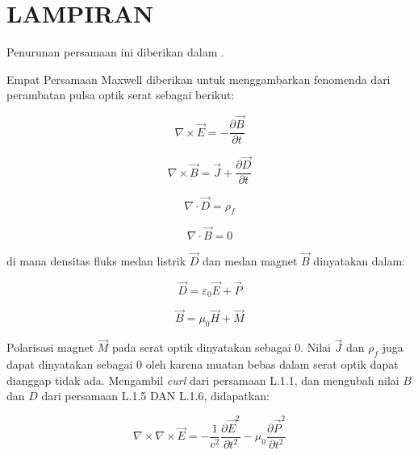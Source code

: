 \chapter*{LAMPIRAN}
\renewcommand{\thetable}{L\theappendix\arabic{table}}
\renewcommand{\thefigure}{L\theappendix\arabic{figure}}
\renewcommand{\theequation}{L\theappendix\arabic{equation}}

Penurunan persamaan ini diberikan dalam .

Empat Persamaan Maxwell diberikan untuk menggambarkan fenomenda dari perambatan pulsa optik serat sebagai berikut: 

\begin{equation}
    \nabla \times \vec{E} = - \frac{\partial \vec{B}}{\partial t}
\end{equation}

\begin{equation}
    \nabla \times \vec{B} = \vec{J}+\frac{\partial \vec{D}}{\partial t}
\end{equation}

\begin{equation}
    \nabla \cdot \vec{D} = \rho_f
\end{equation}

\begin{equation}
    \nabla \cdot \vec{B} = 0
\end{equation}

di mana densitas fluks medan listrik \(\vec{D}\) dan medan magnet \(\vec{B}\) dinyatakan dalam: 

\begin{equation}
    \vec{D} = \varepsilon_0\vec{E} + \vec{P}
\end{equation}

\begin{equation}
    \vec{B} = \mu_0 \vec{H} + \vec{M}
\end{equation}

Polarisasi magnet \(\vec{M}\) pada serat optik dinyatakan sebagai 0. Nilai \(\vec{J}\) dan \(\rho_f\) juga dapat dinyatakan sebagai 0 oleh karena muatan bebas dalam serat optik dapat dianggap tidak ada. Mengambil \emph{curl} dari persamaan L.1.1, dan mengubah nilai \(B\) dan \(D\) dari persamaan L.1.5 DAN L.1.6, didapatkan: 

\begin{equation}
    \nabla \times \nabla \times \vec{E} = -\frac{1}{c^2}\frac{\partial \vec{E}^2}{\partial t^2} - \mu_0\frac{\partial \vec{P}^2}{\partial t^2}
\end{equation}

